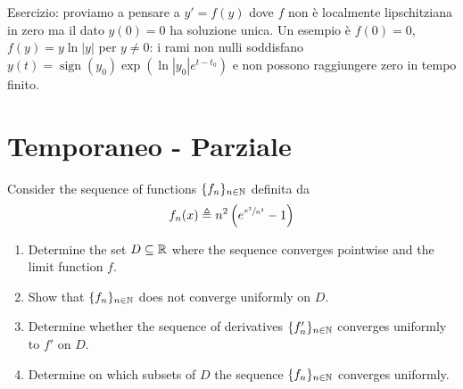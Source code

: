 \documentclass[a4paper]{article}
\begin{document}
\begin{radioactive}
Esercizio: proviamo a pensare a \(y' = f(y)\)
dove \(f\) non è localmente lipschitziana in zero ma il dato \(y(0)=0\)
ha soluzione unica. Un esempio è \(f(0)=0\), \(f(y)=y\ln|y|\) per \(y\neq0\):
i rami non nulli soddisfano
\(y(t)=\operatorname{sign}(y_0)\exp(\ln|y_0|e^{t-t_0})\)
e non possono raggiungere zero in tempo finito.
\end{radioactive}


\pagebreak

\section{Temporaneo - Parziale}

\begin{snippetexercise}{}
    Consider the sequence of functions \(\{f_n\}_{n\in\mathbb{N}}\) definita da
    \[
        f_n(x) \triangleq n^2 \left(
            e^{\sfrac{x^2}{n^2}} - 1
        \right)
    \]
    \begin{enumerate}
        \item Determine the set \(D \subseteq \mathbb{R}\) where the sequence converges pointwise
            and the limit function \(f\).
        \item Show that \(\{f_n\}_{n \in \mathbb{N}}\) does not converge uniformly on \(D\).
        \item Determine whether the sequence of derivatives \(\{f_n'\}_{n \in \mathbb{N}}\)
            converges uniformly to \(f'\) on \(D\).
        \item Determine on which subsets of \(D\) the sequence \(\{f_n\}_{n \in \mathbb{N}}\) converges uniformly.
    \end{enumerate}
\end{snippetexercise}
\end{document}
